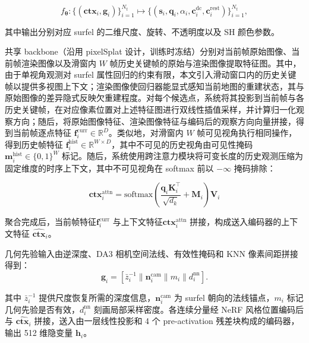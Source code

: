 \begin{equation}
f_{\boldsymbol{\theta}} : \{(\mathbf{ctx}_i, \mathbf{g}_i)\}_{i=1}^{N_t}
\mapsto
\{(\mathbf{s}_i, \mathbf{q}_i, \alpha_i, \mathbf{c}_i^{\mathrm{dc}}, \mathbf{c}_i^{\mathrm{rest}})\}_{i=1}^{N_t},
\end{equation}

其中输出分别对应 surfel 的二维尺度、旋转、不透明度以及 SH 颜色参数。

共享 backbone（沿用 pixelSplat 设计，训练时冻结）分别对当前帧原始图像、当前帧渲染图像以及滑窗内 $W$ 帧历史关键帧的原始与渲染图像提取特征图。其中，由于单视角观测对 surfel 属性回归的约束有限，本文引入滑动窗口内的历史关键帧以提供多视图上下文；渲染图像使回归器能显式感知当前地图的重建状态，其与原始图像的差异隐式反映欠重建程度。对每个候选点，系统将其投影到当前帧与各历史关键帧，在对应像素位置对上述特征图进行双线性插值采样，并计算归一化观察方向；随后，将原始图像特征、渲染图像特征与编码后的观察方向向量拼接，得到当前帧逐点特征 $\mathbf{f}_i^{\text{curr}} \in \mathbb{R}^{D}$。类似地，对滑窗内 $W$ 帧可见视角执行相同操作，得到历史帧特征 $\mathbf{f}_i^{\text{hist}} \in \mathbb{R}^{W \times D}$，其中不可见的历史视角由可见性掩码 $\mathbf{m}_i^{\text{hist}} \in \{0,1\}^{W}$ 标记。随后，系统使用跨注意力模块将可变长度的历史观测压缩为固定维度的时序上下文，其中不可见视角在 softmax 前以 $-\infty$ 掩码排除：

\begin{equation}
\mathbf{ctx}_i^{\text{attn}} = \text{softmax}\!\left(\frac{\mathbf{q}_i \mathbf{K}_i^\top}{\sqrt{d_k}} + \mathbf{M}_i\right) \mathbf{V}_i
\end{equation}

\noindent 聚合完成后，当前帧特征$\mathbf{f}_i^{\text{curr}}$ 与上下文特征$\mathbf{ctx}_i^{\text{attn}}$ 拼接，构成送入编码器的上下文特征 $\hat{\mathbf{ctx}}_i$。

几何先验输入由逆深度、DA3 相机空间法线、有效性掩码和 KNN 像素间距拼接得到：
\begin{equation}
\mathbf{g}_i = [\bar{z}_i^{-1} \| \mathbf{n}_i^{\text{cam}} \| m_i \| d_i^{\text{nn}}].
\end{equation}

\noindent 其中 $\bar{z}_i^{-1}$ 提供尺度恢复所需的深度信息，$\mathbf{n}_i^{\text{cam}}$ 为 surfel 朝向的法线锚点，$m_i$ 标记几何先验是否有效，$d_i^{\text{nn}}$ 刻画局部采样密度。各连续分量经 NeRF 风格位置编码后与 $\hat{\mathbf{ctx}}_i$ 拼接，送入由一层线性投影和 4 个 pre-activation 残差块构成的编码器，输出 512 维隐变量 $\mathbf{h}_i$。


